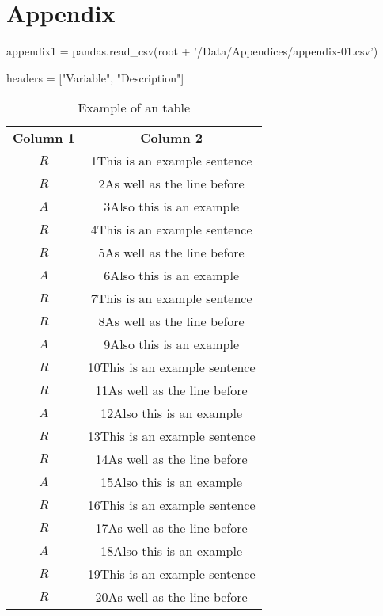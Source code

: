 
\chapter{Appendix} %

\label{AppendixA} %

\begin{pycode} 
	appendix1 = pandas.read_csv(root + '/Data/Appendices/appendix-01.csv')
	
	headers = ["Variable", "Description"]
\end{pycode}

\begin{longtable}{cc}  
	\caption{Example of an table} \\
	\textbf{Column 1} & \textbf{Column 2} \\[6pt]
	$R$ & 1This is an example sentence \\[6pt]
	$R$ & 2As well as the line before \\[6pt]
	$A$ & 3Also this is an example \\[6pt]
	$R$ & 4This is an example sentence \\[6pt]
	$R$ & 5As well as the line before \\[6pt]
	$A$ & 6Also this is an example \\[6pt]
	$R$ & 7This is an example sentence \\[6pt]
	$R$ & 8As well as the line before \\[6pt]
	$A$ & 9Also this is an example \\[6pt]
	$R$ & 10This is an example sentence \\[6pt]
	$R$ & 11As well as the line before \\[6pt]
	$A$ & 12Also this is an example \\[6pt]
	$R$ & 13This is an example sentence \\[6pt]
	$R$ & 14As well as the line before \\[6pt]
	$A$ & 15Also this is an example \\[6pt]
	$R$ & 16This is an example sentence \\[6pt]
	$R$ & 17As well as the line before \\[6pt]
	$A$ & 18Also this is an example \\[6pt]
	$R$ & 19This is an example sentence \\[6pt]
	$R$ & 20As well as the line before \\[6pt]

\end{longtable}
